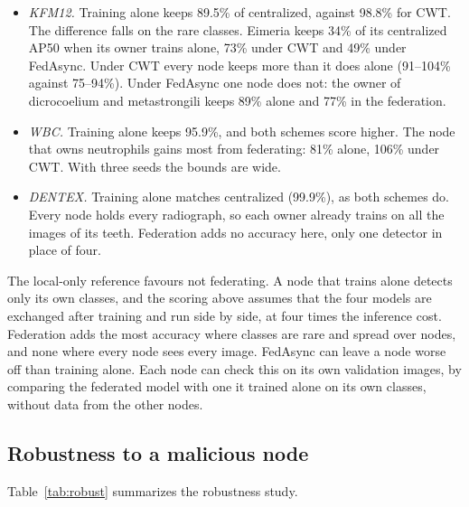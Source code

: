 \documentclass[pdflatex,sn-mathphys-num]{sn-jnl}
\begin{document}
\begin{itemize}
\item \emph{KFM12.} Training alone keeps 89.5\% of centralized, against 98.8\% for CWT. The difference falls on the rare classes. Eimeria keeps 34\% of its centralized AP50 when its owner trains alone, 73\% under CWT and 49\% under FedAsync. Under CWT every node keeps more than it does alone (91--104\% against 75--94\%). Under FedAsync one node does not: the owner of dicrocoelium and metastrongili keeps 89\% alone and 77\% in the federation.
\item \emph{WBC.} Training alone keeps 95.9\%, and both schemes score higher. The node that owns neutrophils gains most from federating: 81\% alone, 106\% under CWT. With three seeds the bounds are wide.
\item \emph{DENTEX.} Training alone matches centralized (99.9\%), as both schemes do. Every node holds every radiograph, so each owner already trains on all the images of its teeth. Federation adds no accuracy here, only one detector in place of four.
\end{itemize}
The local-only reference favours not federating. A node that trains alone detects only its own classes, and the scoring above assumes that the four models are exchanged after training and run side by side, at four times the inference cost. Federation adds the most accuracy where classes are rare and spread over nodes, and none where every node sees every image. FedAsync can leave a node worse off than training alone. Each node can check this on its own validation images, by comparing the federated model with one it trained alone on its own classes, without data from the other nodes.

\subsection{Robustness to a malicious node}\label{sec:res-robust}
Table~\ref{tab:robust} summarizes the robustness study.
\end{document}

